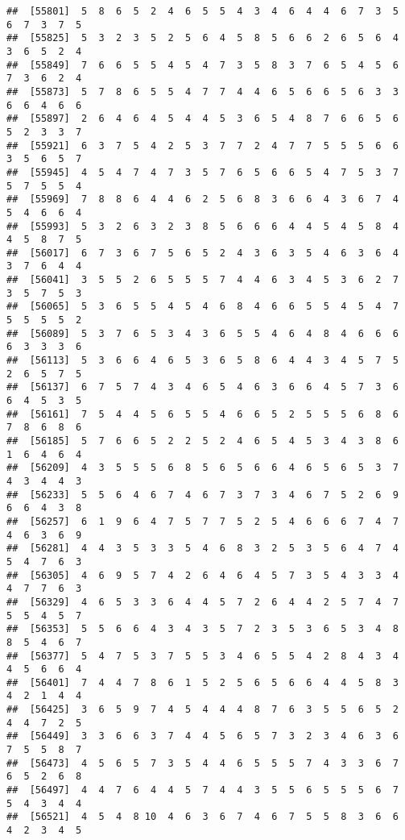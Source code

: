 \documentclass[
]{book}
\begin{document}
\begin{verbatim}
##  [55801]  5  8  6  5  2  4  6  5  5  4  3  4  6  4  4  6  7  3  5  6  7  3  7  5
##  [55825]  5  3  2  3  5  2  5  6  4  5  8  5  6  6  2  6  5  6  4  3  6  5  2  4
##  [55849]  7  6  6  5  5  4  5  4  7  3  5  8  3  7  6  5  4  5  6  7  3  6  2  4
##  [55873]  5  7  8  6  5  5  4  7  7  4  4  6  5  6  6  5  6  3  3  6  6  4  6  6
##  [55897]  2  6  4  6  4  5  4  4  5  3  6  5  4  8  7  6  6  5  6  5  2  3  3  7
##  [55921]  6  3  7  5  4  2  5  3  7  7  2  4  7  7  5  5  5  6  6  3  5  6  5  7
##  [55945]  4  5  4  7  4  7  3  5  7  6  5  6  6  5  4  7  5  3  7  5  7  5  5  4
##  [55969]  7  8  8  6  4  4  6  2  5  6  8  3  6  6  4  3  6  7  4  5  4  6  6  4
##  [55993]  5  3  2  6  3  2  3  8  5  6  6  6  4  4  5  4  5  8  4  4  5  8  7  5
##  [56017]  6  7  3  6  7  5  6  5  2  4  3  6  3  5  4  6  3  6  4  3  7  6  4  4
##  [56041]  3  5  5  2  6  5  5  5  7  4  4  6  3  4  5  3  6  2  7  3  5  7  5  3
##  [56065]  5  3  6  5  5  4  5  4  6  8  4  6  6  5  5  4  5  4  7  5  5  5  5  2
##  [56089]  5  3  7  6  5  3  4  3  6  5  5  4  6  4  8  4  6  6  6  6  3  3  3  6
##  [56113]  5  3  6  6  4  6  5  3  6  5  8  6  4  4  3  4  5  7  5  2  6  5  7  5
##  [56137]  6  7  5  7  4  3  4  6  5  4  6  3  6  6  4  5  7  3  6  6  4  5  3  5
##  [56161]  7  5  4  4  5  6  5  5  4  6  6  5  2  5  5  5  6  8  6  7  8  6  8  6
##  [56185]  5  7  6  6  5  2  2  5  2  4  6  5  4  5  3  4  3  8  6  1  6  4  6  4
##  [56209]  4  3  5  5  5  6  8  5  6  5  6  6  4  6  5  6  5  3  7  4  3  4  4  3
##  [56233]  5  5  6  4  6  7  4  6  7  3  7  3  4  6  7  5  2  6  9  6  6  4  3  8
##  [56257]  6  1  9  6  4  7  5  7  7  5  2  5  4  6  6  6  7  4  7  4  6  3  6  9
##  [56281]  4  4  3  5  3  3  5  4  6  8  3  2  5  3  5  6  4  7  4  5  4  7  6  3
##  [56305]  4  6  9  5  7  4  2  6  4  6  4  5  7  3  5  4  3  3  4  4  7  7  6  3
##  [56329]  4  6  5  3  3  6  4  4  5  7  2  6  4  4  2  5  7  4  7  5  5  4  5  7
##  [56353]  5  5  6  6  4  3  4  3  5  7  2  3  5  3  6  5  3  4  8  8  5  4  6  7
##  [56377]  5  4  7  5  3  7  5  5  3  4  6  5  5  4  2  8  4  3  4  4  5  6  6  4
##  [56401]  7  4  4  7  8  6  1  5  2  5  6  5  6  6  4  4  5  8  3  4  2  1  4  4
##  [56425]  3  6  5  9  7  4  5  4  4  4  8  7  6  3  5  5  6  5  2  4  4  7  2  5
##  [56449]  3  3  6  6  3  7  4  4  5  6  5  7  3  2  3  4  6  3  6  7  5  5  8  7
##  [56473]  4  5  6  5  7  3  5  4  4  6  5  5  5  7  4  3  3  6  7  6  5  2  6  8
##  [56497]  4  4  7  6  4  4  5  7  4  4  3  5  5  6  5  5  5  6  7  5  4  3  4  4
##  [56521]  4  5  4  8 10  4  6  3  6  7  4  6  7  5  5  8  3  6  6  4  2  3  4  5

\end{verbatim}
\end{document}
